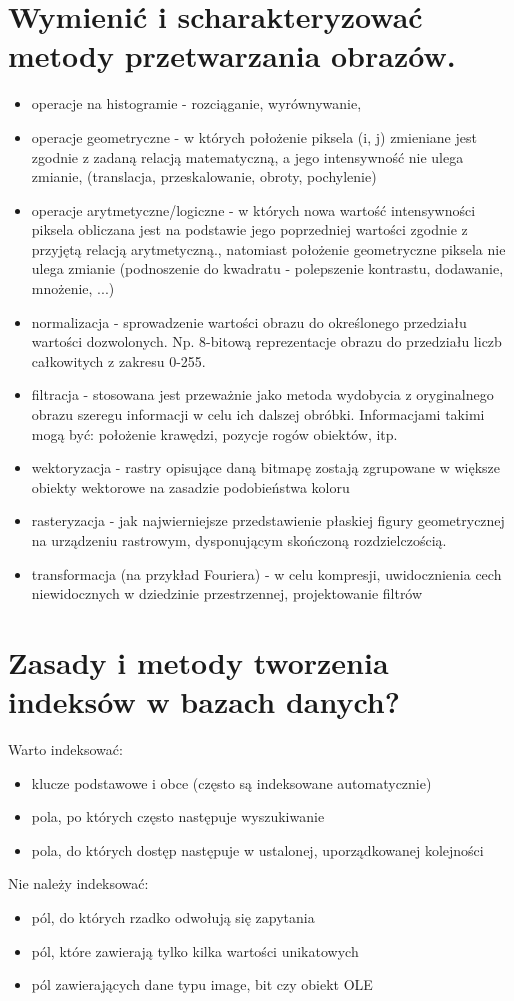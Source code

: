 \documentclass[12pt,a4paper]{article}
\begin{document}
	\section{Wymienić i scharakteryzować metody przetwarzania obrazów.}
	\begin{itemize}
		\item operacje na histogramie - rozciąganie, wyrównywanie, 
		\item operacje geometryczne - w których położenie piksela (i, j) zmieniane jest zgodnie z zadaną relacją matematyczną, a jego intensywność nie ulega zmianie, (translacja, przeskalowanie, obroty, pochylenie)
		\item operacje arytmetyczne/logiczne - w których nowa wartość intensywności piksela obliczana jest na podstawie jego poprzedniej wartości zgodnie z przyjętą relacją arytmetyczną., natomiast położenie geometryczne piksela nie ulega zmianie (podnoszenie do kwadratu - polepszenie kontrastu, dodawanie, mnożenie, ...)
		\item normalizacja - sprowadzenie wartości obrazu do określonego przedziału wartości dozwolonych. Np. 8-bitową reprezentacje obrazu do przedziału liczb całkowitych z zakresu 0-255.
		\item filtracja - stosowana jest przeważnie jako metoda wydobycia z oryginalnego obrazu szeregu informacji w celu ich dalszej obróbki. Informacjami takimi mogą być: położenie krawędzi, pozycje rogów obiektów, itp. 
		\item wektoryzacja -  rastry opisujące daną bitmapę zostają zgrupowane w większe obiekty wektorowe na zasadzie podobieństwa koloru
		\item rasteryzacja - jak najwierniejsze przedstawienie płaskiej figury geometrycznej na urządzeniu rastrowym, dysponującym skończoną rozdzielczością.
		\item transformacja (na przykład Fouriera) - w celu kompresji, uwidocznienia cech niewidocznych w dziedzinie przestrzennej, projektowanie filtrów
	\end{itemize}

	\section{Zasady i metody tworzenia indeksów w bazach danych?}
	Warto indeksować:
	\begin{itemize}
		\item klucze podstawowe i obce (często są indeksowane automatycznie)
		\item pola, po których często następuje wyszukiwanie
		\item pola, do których dostęp następuje w ustalonej, uporządkowanej kolejności
	\end{itemize}
	Nie należy indeksować:
	\begin{itemize}
		\item pól, do których rzadko odwołują się zapytania
		\item pól, które zawierają tylko kilka wartości unikatowych
		\item pól zawierających dane typu image, bit czy obiekt OLE 
	\end{itemize}
\end{document}
